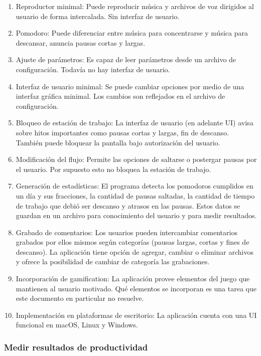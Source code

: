 \documentclass[12pt,letterpaper]{report}
\providecommand{\tightlist}{%
  \setlength{\itemsep}{0pt}\setlength{\parskip}{0pt}}
\begin{document}
\begin{enumerate}
\tightlist
\item
  Reproductor minimal: Puede reproducir música y archivos de voz
  dirigidos al usuario de forma intercalada. Sin interfaz de usuario.
\item
  Pomodoro: Puede diferenciar entre música para concentrarse y música
  para descansar, anuncia pausas cortas y largas.
\item
  Ajuste de parámetros: Es capaz de leer parámetros desde un archivo de
  configuración. Todavía no hay interfaz de usuario.
\item
  Interfaz de usuario minimal: Se puede cambiar opciones por medio de
  una interfaz gráfica minimal. Los cambios son reflejados en el archivo
  de configuración.
\item
  Bloqueo de estación de trabajo: La interfaz de usuario (en adelante
  UI) avisa sobre hitos importantes como pausas cortas y largas, fin de
  descanso. También puede bloquear la pantalla bajo autorización del
  usuario.
\item
  Modificación del flujo: Permite las opciones de saltarse o postergar
  pausas por el usuario. Por supuesto esto no bloquea la estación de
  trabajo.
\item
  Generación de estadísticas: El programa detecta los pomodoros
  cumplidos en un día y sus fracciones, la cantidad de pausas saltadas,
  la cantidad de tiempo de trabajo que debió ser descanso y atrasos en
  las pausas. Estos datos se guardan en un archivo para conocimiento del
  usuario y para medir resultados.
\item
  Grabado de comentarios: Los usuarios pueden intercambiar comentarios
  grabados por ellos mismos según categorías (pausas largas, cortas y
  fines de descanso). La aplicación tiene opción de agregar, cambiar o
  eliminar archivos y ofrece la posibilidad de cambiar de categoría las
  grabaciones.
\item
  Incorporación de gamification: La aplicación provee elementos del
  juego que mantienen al usuario motivado. Qué elementos se incorporan
  es una tarea que este documento en particular no resuelve.
\item
  Implementación en plataformas de escritorio: La aplicación cuenta con
  una UI funcional en macOS, Linux y Windows.
\end{enumerate}

\hypertarget{medir-resultados-de-productividad}{%
\subsubsection{Medir resultados de
productividad}\label{medir-resultados-de-productividad}}
\end{document}

